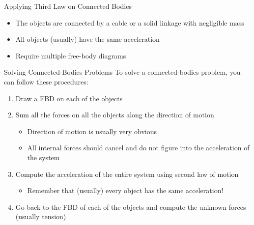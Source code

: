 \documentclass[12pt,compress,aspectratio=169]{beamer}
\begin{document}
\begin{frame}{Applying Third Law on Connected Bodies}
  \begin{center}
  \end{center}
  \begin{itemize}
  \item The objects are connected by a cable or a solid linkage with negligible
    mass
  \item All objects (usually) have the same acceleration
  \item Require multiple free-body diagrams
  \end{itemize}
\end{frame}



\begin{frame}{Solving Connected-Bodies Problems}
  To solve a connected-bodies problem, you can follow these procedures:
  \begin{enumerate}
  \item Draw a FBD on each of the objects
  \item Sum all the forces on all the objects along the direction of motion
    \begin{itemize}
    \item Direction of motion is usually very obvious
    \item All internal forces should cancel and do not figure into the
      acceleration of the system
    \end{itemize}
  \item Compute the acceleration of the entire system using second law of motion
    \begin{itemize}
    \item Remember that (usually) every object has the same acceleration!
    \end{itemize}
  \item Go back to the FBD of each of the objects and compute the unknown
    forces (usually tension)
  \end{enumerate}
\end{frame}



\end{document}
